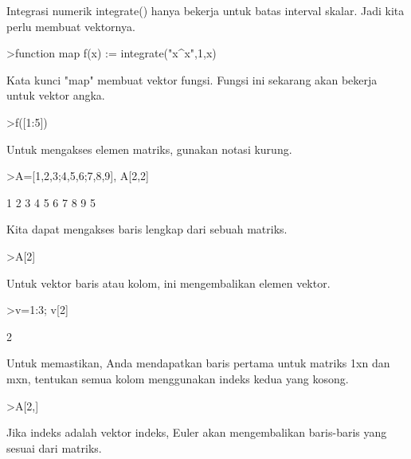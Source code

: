 \documentclass[a4paper,10pt]{article}
\begin{document}
\begin{eulernotebook}
\begin{eulercomment}
Integrasi numerik integrate() hanya bekerja untuk batas interval
skalar. Jadi kita perlu membuat vektornya.
\end{eulercomment}
\begin{eulerprompt}
>function map f(x) := integrate("x^x",1,x)
\end{eulerprompt}
\begin{eulercomment}
Kata kunci "map" membuat vektor fungsi. Fungsi ini sekarang akan
bekerja untuk vektor angka.
\end{eulercomment}
\begin{eulerprompt}
>f([1:5])
\end{eulerprompt}
\begin{euleroutput}
  [0,  2.05045,  13.7251,  113.336,  1241.03]
\end{euleroutput}
\begin{eulercomment}
Untuk mengakses elemen matriks, gunakan notasi kurung.
\end{eulercomment}
\begin{eulerprompt}
>A=[1,2,3;4,5,6;7,8,9], A[2,2]
\end{eulerprompt}
\begin{euleroutput}
              1             2             3 
              4             5             6 
              7             8             9 
  5
\end{euleroutput}
\begin{eulercomment}
Kita dapat mengakses baris lengkap dari sebuah matriks.
\end{eulercomment}
\begin{eulerprompt}
>A[2]
\end{eulerprompt}
\begin{euleroutput}
  [4,  5,  6]
\end{euleroutput}
\begin{eulercomment}
Untuk vektor baris atau kolom, ini mengembalikan elemen vektor.
\end{eulercomment}
\begin{eulerprompt}
>v=1:3; v[2]
\end{eulerprompt}
\begin{euleroutput}
  2
\end{euleroutput}
\begin{eulercomment}
Untuk memastikan, Anda mendapatkan baris pertama untuk matriks 1xn dan
mxn, tentukan semua kolom menggunakan indeks kedua yang kosong.
\end{eulercomment}
\begin{eulerprompt}
>A[2,]
\end{eulerprompt}
\begin{euleroutput}
  [4,  5,  6]
\end{euleroutput}
\begin{eulercomment}
Jika indeks adalah vektor indeks, Euler akan mengembalikan baris-baris
yang sesuai dari matriks.


\end{eulercomment}
\end{eulernotebook}
\end{document}
